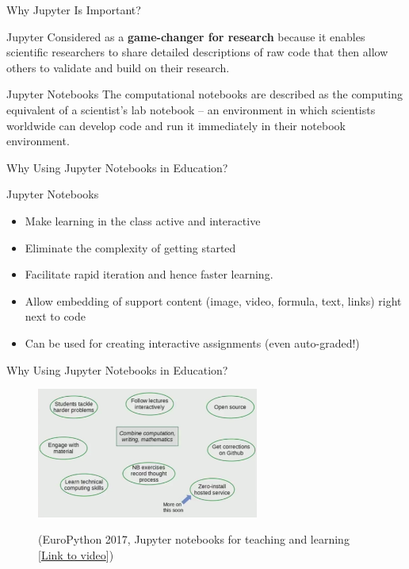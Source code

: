 \documentclass[11pt,t]{beamer}
\begin{document}
\begin{frame}[fragile]{Why Jupyter Is Important?}

	\begin{block}{Jupyter}
	Considered as a \textbf{game-changer for research} because it enables scientific researchers to share detailed descriptions of raw code that then allow others to validate and build on their research.
	\end{block}  

 
	\begin{block}{Jupyter Notebooks}
The computational notebooks are described as the computing equivalent of a scientist’s lab notebook -- an environment in which scientists worldwide can develop code and run it immediately in their notebook environment.
	\end{block}  
	
\end{frame}

\begin{frame}[fragile]{Why Using Jupyter Notebooks in Education?}  

Jupyter Notebooks

\begin{itemize}
\item
Make learning in the class active and interactive
\item
Eliminate the complexity of getting started
\item
Facilitate rapid iteration and hence faster learning.
\item
Allow embedding of support content (image, video, formula, text, links) right next to code
\item
Can be used for creating interactive assignments (even auto-graded!)
\end{itemize}

\end{frame}

\begin{frame}[fragile]{Why Using Jupyter Notebooks in Education?}
			
			\begin{figure}
			\centering
			\includegraphics[width=0.65\textwidth]{jupyter_why}
			
			\vspace{5pt}
			\footnotesize (EuroPython 2017,  Jupyter notebooks for teaching and learning [\href{https://av.tib.eu/media/33805}{Link to video}])
			
			\end{figure}
\end{frame}
\end{document}
